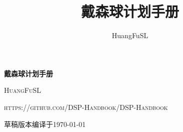 \documentclass{book}
\title{戴森球计划手册}
\author{HuangFuSL}
\providecommand{\commitId}{草稿}
\begin{document}
    \begin{titlepage}
        \begin{center}
            \vspace*{1cm}
    
            \textbf{\Huge 戴森球计划手册}
                
            \vspace{1.5cm}
    
            \textsc{\Large HuangFuSL}
    
            \vfill
                
            \textsc{https://github.com/DSP-Handbook/DSP-Handbook}

            \commitId 版本编译于\today\thistime
                
        \end{center}

    \end{titlepage}
    \tableofcontents
    
    
    
    
    
    
    
    

    \appendix
    
    
    
    
    
\end{document}
